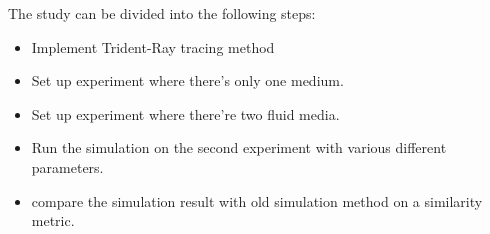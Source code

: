 The study can be divided into the following steps:

\begin{itemize}
    \item Implement Trident-Ray tracing method
    \item Set up experiment where there's only one medium.
    \item Set up experiment where there're two fluid media.
    \item Run the simulation on the second experiment with various different parameters.
    \item compare the simulation result with old simulation method on a similarity metric.
\end{itemize}
